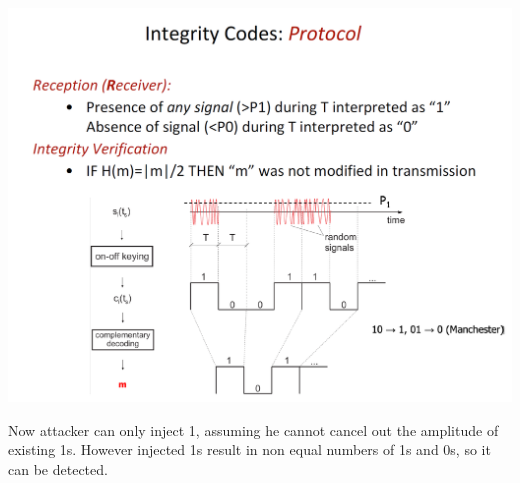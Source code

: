 \begin{minipage}{\linewidth}
    \centering      
    \includegraphics[width=\linewidth]{Figures/L7_integrity_codes.PNG} 
\end{minipage}

Now attacker can only inject 1, assuming he cannot cancel out the amplitude of existing 1s. However injected 1s result in non equal numbers of 1s and 0s, so it can be detected.

